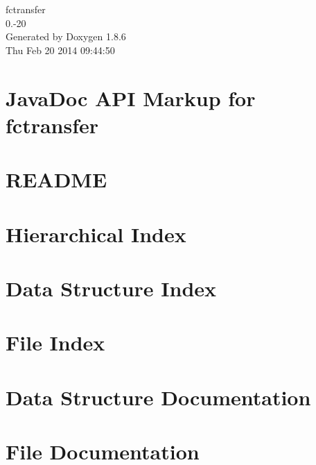 \documentclass[twoside]{book}
\newcommand{\clearemptydoublepage}{%
  \newpage{\pagestyle{empty}\cleardoublepage}%
}
\begin{document}
\begin{titlepage}
\vspace*{7cm}
\begin{center}%
{\Large fctransfer \\[1ex]\large 0.-\/20 }\\
\vspace*{1cm}
{\large Generated by Doxygen 1.8.6}\\
\vspace*{0.5cm}
{\small Thu Feb 20 2014 09:44:50}\\
\end{center}
\end{titlepage}
\clearemptydoublepage
\tableofcontents
\clearemptydoublepage
{}

\chapter{Java\-Doc A\-P\-I Markup for fctransfer}
\label{index}
\chapter{R\-E\-A\-D\-M\-E}
\label{md_htdocs_README}

\chapter{Hierarchical Index}

\chapter{Data Structure Index}

\chapter{File Index}

\chapter{Data Structure Documentation}











\chapter{File Documentation}





\newpage
{}
{}
\printindex
\end{document}
